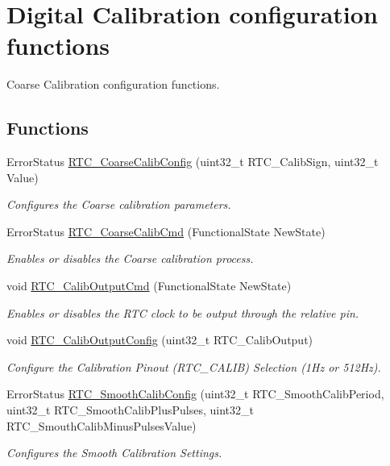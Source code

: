 \hypertarget{group___r_t_c___group7}{\section{Digital Calibration configuration functions}
\label{group___r_t_c___group7}
}


Coarse Calibration configuration functions.  


\subsection*{Functions}
\begin{DoxyCompactItemize}
\item 
Error\-Status \hyperlink{group___r_t_c___group7_gaa3bb10170a2c70ac9ce3e41c611bdd43}{R\-T\-C\-\_\-\-Coarse\-Calib\-Config} (uint32\-\_\-t R\-T\-C\-\_\-\-Calib\-Sign, uint32\-\_\-t Value)
\begin{DoxyCompactList}\small\item\em Configures the Coarse calibration parameters. \end{DoxyCompactList}\item 
Error\-Status \hyperlink{group___r_t_c___group7_ga008ae7173b2befe876f5e76686bc9089}{R\-T\-C\-\_\-\-Coarse\-Calib\-Cmd} (Functional\-State New\-State)
\begin{DoxyCompactList}\small\item\em Enables or disables the Coarse calibration process. \end{DoxyCompactList}\item 
void \hyperlink{group___r_t_c___group7_ga25eaa2de5ee858a4572d5fb1eb146ff8}{R\-T\-C\-\_\-\-Calib\-Output\-Cmd} (Functional\-State New\-State)
\begin{DoxyCompactList}\small\item\em Enables or disables the R\-T\-C clock to be output through the relative pin. \end{DoxyCompactList}\item 
void \hyperlink{group___r_t_c___group7_ga2139adc802bdb6882904c0b855d50b29}{R\-T\-C\-\_\-\-Calib\-Output\-Config} (uint32\-\_\-t R\-T\-C\-\_\-\-Calib\-Output)
\begin{DoxyCompactList}\small\item\em Configure the Calibration Pinout (R\-T\-C\-\_\-\-C\-A\-L\-I\-B) Selection (1\-Hz or 512\-Hz). \end{DoxyCompactList}\item 
Error\-Status \hyperlink{group___r_t_c___group7_ga91a28dcc7d45340a469dd8b8c029f841}{R\-T\-C\-\_\-\-Smooth\-Calib\-Config} (uint32\-\_\-t R\-T\-C\-\_\-\-Smooth\-Calib\-Period, uint32\-\_\-t R\-T\-C\-\_\-\-Smooth\-Calib\-Plus\-Pulses, uint32\-\_\-t R\-T\-C\-\_\-\-Smouth\-Calib\-Minus\-Pulses\-Value)
\begin{DoxyCompactList}\small\item\em Configures the Smooth Calibration Settings. \end{DoxyCompactList}\end{DoxyCompactItemize}


